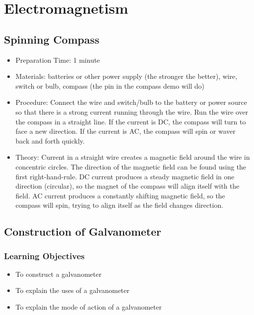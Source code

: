 \section{Electromagnetism}
\label{sec:electromagnetism}



\subsection{Spinning Compass}
\begin{itemize}
\item{Preparation Time: 1 minute}
\item{Materials: batteries or other power supply (the stronger the better), wire, switch or bulb, compass (the pin in the compass demo will do)}
\item{Procedure: Connect the wire and switch/bulb to the battery or power source so that there is a strong current running through the wire. Run the wire over the compass in a straight line. If the current is DC, the compass will turn to face a new direction. If the current is AC, the compass will spin or waver back and forth quickly.}
\item{Theory: Current in a straight wire creates a magnetic field around the wire in concentric circles. The direction of the magnetic field can be found using the first right-hand-rule. DC current produces a steady magnetic field in one direction (circular), so the magnet of the compass will align itself with the field. AC current produces a constantly shifting magnetic field, so the compass will spin, trying to align itself as the field changes direction.}
\end{itemize}


\subsection{Construction of Galvanometer}

\subsubsection*{Learning Objectives}
\begin{itemize}
\item{To construct a galvanometer}
\item{To explain the uses of a galvanometer}
\item{To explain the mode of action of a galvanometer}
\end{itemize}

